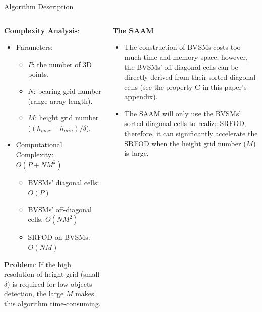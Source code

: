 \documentclass[final,hyperref={pdfpagelabels=false}]{beamer}
\begin{document}
\begin{frame}[t]
\begin{columns}[t]
\begin{column}{.48\textwidth}
\begin{block}{Algorithm Description}
\begin{columns}
\begin{column}{0.49\textwidth}
\begin{framed}
			\textbf{Complexity Analysis}:
			\begin{itemize}
				\item Parameters:
				\begin{itemize}
					\item $P$: the number of 3D points.
					\item $N$: bearing grid number (range array length).
					\item $M$: height grid number ($(h_{max}-h_{min})/\delta$).
				\end{itemize}
				\item Computational Complexity: $O(P+NM^2)$
				\begin{itemize}
					\item BVSMs' diagonal cells: $O(P)$
					\item BVSMs' off-diagonal cells: $O(NM^2)$
					\item SRFOD on BVSMs: $O(NM)$
				\end{itemize}
			\end{itemize}
			\textbf{Problem}: If the high resolution of height grid (small $\delta$) is required for low objects detection, the large $M$ makes this algorithm time-consuming.
			\vspace{0.2em}
		\end{framed}
	\end{column}
		
		\begin{column}{0.49\textwidth}
			\begin{framed}
				\begin{center}
					\textbf{The SAAM}
				\end{center}
				\begin{itemize}
					\item The construction of BVSMs costs too much time and memory space; however, the BVSMs' off-diagonal cells can be directly derived from their sorted diagonal cells (see the property C in this paper's appendix).
					\item The SAAM will only use the BVSMs' sorted diagonal cells to realize SRFOD; therefore, it can significantly accelerate the SRFOD when the height grid number ($M$) is large.
				\end{itemize}
				

\end{framed}
\end{column}
\end{columns}
\end{block}
\end{column}
\end{columns}
\end{frame}
\end{document}
